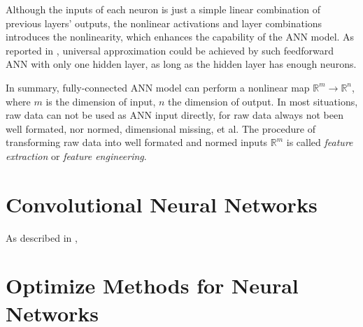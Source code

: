 Although the inputs of each neuron is just a simple linear combination of previous
layers' outputs, the nonlinear activations and layer combinations introduces the
nonlinearity, which enhances the capability of the ANN model. 
As reported in \cite{hornik1989multilayer}, universal approximation could be achieved by
such feedforward ANN with only one hidden layer, as long as the hidden layer has enough neurons.

In summary, fully-connected ANN model can perform a nonlinear map $\mathbb{R}^m \to \mathbb{R}^n$,
where $m$ is the dimension of input, $n$ the dimension of output. In most situations, raw data
can not be used as ANN input directly, for raw data always not been well formated, nor normed, 
dimensional missing, et al.
The procedure of transforming raw data into well formated and normed inputs $\mathbb{R}^m$ is called
\textit{feature extraction} or \textit{feature engineering}.

\section{Convolutional Neural Networks} \label{sec::intro_cnn}
As described in \cite{Goodfellow2016Deep}, 

\section{Optimize Methods for Neural Networks}
